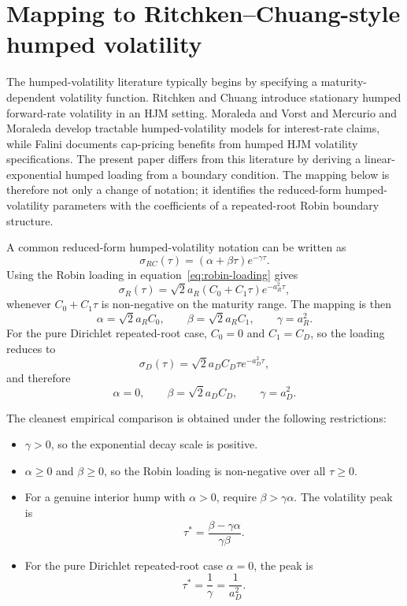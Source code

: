 \documentclass[11pt]{article}
\numberwithin{equation}{section}
\begin{document}
\clearpage
\section{Mapping to Ritchken--Chuang-style humped volatility}

The humped-volatility literature typically begins by specifying a maturity-dependent volatility function. Ritchken and Chuang introduce stationary humped forward-rate volatility in an HJM setting. Moraleda and Vorst and Mercurio and Moraleda develop tractable humped-volatility models for interest-rate claims, while Falini documents cap-pricing benefits from humped HJM volatility specifications. The present paper differs from this literature by deriving a linear-exponential humped loading from a boundary condition. The mapping below is therefore not only a change of notation; it identifies the reduced-form humped-volatility parameters with the coefficients of a repeated-root Robin boundary structure.

A common reduced-form humped-volatility notation can be written as
\begin{equation}
\label{eq:rc-volatility}
\sigma_{RC}(\tau)=(\alpha+\beta\tau)e^{-\gamma\tau}.
\end{equation}
Using the Robin loading in equation~\eqref{eq:robin-loading} gives
\begin{equation}
\sigma_R(\tau)
=
\sqrt{2}a_R(C_0+C_1\tau)e^{-a_R^2\tau},
\end{equation}
whenever $C_0+C_1\tau$ is non-negative on the maturity range. The mapping is then
\begin{equation}
\label{eq:rc-robin-mapping}
\alpha=\sqrt{2}a_RC_0,
\qquad
\beta=\sqrt{2}a_RC_1,
\qquad
\gamma=a_R^2.
\end{equation}
For the pure Dirichlet repeated-root case, $C_0=0$ and $C_1=C_D$, so the loading reduces to
\begin{equation}
\sigma_D(\tau)=\sqrt{2}a_DC_D\tau e^{-a_D^2\tau},
\end{equation}
and therefore
\begin{equation}
\alpha=0,
\qquad
\beta=\sqrt{2}a_DC_D,
\qquad
\gamma=a_D^2.
\end{equation}

The cleanest empirical comparison is obtained under the following restrictions:
\begin{itemize}
  \item $\gamma>0$, so the exponential decay scale is positive.
  \item $\alpha\geq0$ and $\beta\geq0$, so the Robin loading is non-negative over all $\tau\geq0$.
  \item For a genuine interior hump with $\alpha>0$, require $\beta>\gamma\alpha$. The volatility peak is
  \begin{equation}
  \tau^* = \frac{\beta-\gamma\alpha}{\gamma\beta}.
  \end{equation}
  \item For the pure Dirichlet repeated-root case $\alpha=0$, the peak is
  \begin{equation}
  \tau^*=\frac{1}{\gamma}=\frac{1}{a_D^2}.
  \end{equation}
\end{itemize}
\end{document}
